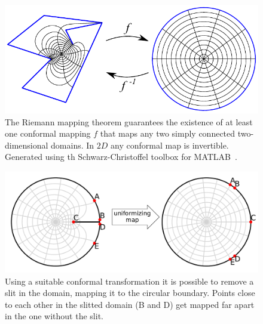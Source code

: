 \begin{figure}
\begin{center}
    \includegraphics[scale=1.0]{chapters/ch4-sle/figs/scmap}
\end{center}
\caption{The Riemann mapping theorem guarantees the existence of at least one
    conformal mapping $f$ that maps any two simply connected two-dimensional
    domains. In $2D$ any conformal map is invertible. Generated using th
    Schwarz-Christoffel toolbox for MATLAB~\cite{Driscoll2005}.}
\label{fig:scmap}
\end{figure}


\begin{figure}
\begin{center}
    \includegraphics[width=\textwidth]{chapters/ch4-sle/figs/diskfix}
\end{center}
\caption{Using a suitable conformal transformation it is possible to remove
    a slit in the domain, mapping it to the circular boundary. Points close
    to each other in the slitted domain (B and D) get mapped far apart in
    the one without the slit.}
\label{fig:diskfix}
\end{figure}

